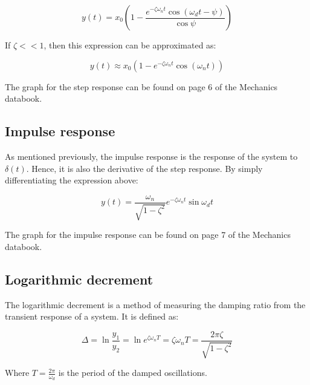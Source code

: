 \documentclass[12pt]{article}
\begin{document}
\[ y(t) = x_0\left(1 - \frac{e^{-\zeta\omega_n t}\cos{(\omega_d t - \psi)}}{\cos{\psi}}\right) \]

If $\zeta << 1$, then this expression can be approximated as:

\[ y(t) \approx x_0\left(1 - e^{-\zeta\omega_n t}\cos{(\omega_n t)}\right) \]

The graph for the step response can be found on page 6 of the Mechanics databook.

\subsection{Impulse response}

As mentioned previously, the impulse response is the response of the system to $\delta(t)$. Hence, it is also the derivative of the step response. By simply differentiating the expression above:

\[ y(t) = \frac{\omega_n}{\sqrt{1 - \zeta^2}}e^{-\zeta\omega_n t}\sin{\omega_d t} \]

The graph for the impulse response can be found on page 7 of the Mechanics databook.

\subsection{Logarithmic decrement}

\begin{definition}
  The logarithmic decrement is a method of measuring the damping ratio from the transient response of a system. It is defined as:

  \[ \Delta = \ln{\frac{y_1}{y_2}} = \ln{e^{\zeta\omega_nT}} = \zeta\omega_nT = \frac{2\pi\zeta}{\sqrt{1 - \zeta^2}} \]

  Where $T = \frac{2\pi}{\omega_d}$ is the period of the damped oscillations.
\end{definition}
\end{document}
